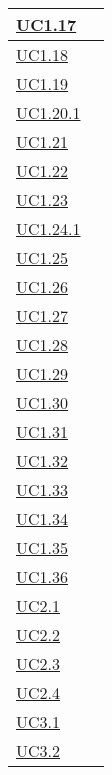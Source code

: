 \begin{longtable}{|P{6cm}|P{6cm}|}
	\hline \hyperref[UC1.17]{UC1.17} &  \\
	\hline \hyperref[UC1.18]{UC1.18} &  \\
	\hline \hyperref[UC1.19]{UC1.19} &  \\
	\hline \hyperref[UC1.20.1]{UC1.20.1} &  \\
	\hline \hyperref[UC1.21]{UC1.21} &  \\
	\hline \hyperref[UC1.22]{UC1.22} &  \\
	\hline \hyperref[UC1.23]{UC1.23} &  \\
	\hline \hyperref[UC1.24.1]{UC1.24.1} &  \\
	\hline \hyperref[UC1.25]{UC1.25} &  \\
	\hline \hyperref[UC1.26]{UC1.26} &  \\
	\hline \hyperref[UC1.27]{UC1.27} &  \\
	\hline \hyperref[UC1.28]{UC1.28} &  \\
	\hline \hyperref[UC1.29]{UC1.29} &  \\
	\hline \hyperref[UC1.30]{UC1.30} &  \\
	\hline \hyperref[UC1.31]{UC1.31} &  \\
	\hline \hyperref[UC1.32]{UC1.32} &  \\
	\hline \hyperref[UC1.33]{UC1.33} &  \\
	\hline \hyperref[UC1.34]{UC1.34} &  \\
	\hline \hyperref[UC1.35]{UC1.35} &  \\
	\hline \hyperref[UC1.36]{UC1.36} &  \\	
	\hline \hyperref[UC2.1]{UC2.1} &  \\
	\hline \hyperref[UC2.2]{UC2.2} &  \\
	\hline \hyperref[UC2.3]{UC2.3} &  \\
	\hline \hyperref[UC2.4]{UC2.4} &  \\	
	\hline \hyperref[UC3.1]{UC3.1} &  \\
	\hline \hyperref[UC3.2]{UC3.2} &  \\

\end{longtable}
